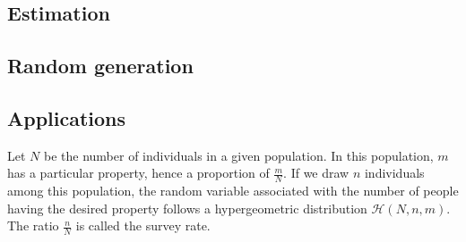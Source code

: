 \subsection{Estimation}
\subsection{Random generation}
\subsection{Applications}
Let $N$ be the number of individuals in a given population. In this population, $m$ has a particular property, hence a proportion of $\frac{m}{N}$. If we draw $n$ individuals among this population, the random variable associated with the number of people having the desired property follows a hypergeometric distribution $\mathcal H(N,n,m)$. The ratio $\frac{n}{N}$ is called the survey rate.
